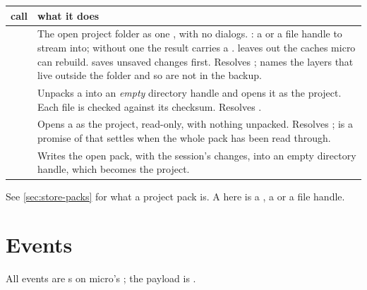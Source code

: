 \begin{tabularx}{\linewidth}{@{}>{\raggedright\arraybackslash}p{44mm}L@{}}
\toprule
call & what it does \\
\midrule
{} & The open project folder as one , with no dialogs.
  : a  or a file handle to stream into; without one the result
  carries a .  leaves out the caches micro can rebuild.
   saves unsaved changes first. Resolves
  ;  names the layers that live
  outside the folder and so are not in the backup. \\
 & Unpacks a  into an \emph{empty} directory
  handle and opens it as the project. Each file is checked against its checksum. Resolves
  . \\
 & Opens a  as the project, read-only, with nothing
  unpacked. Resolves ;  is a promise
  of  that settles when the whole pack has been read through. \\
 & Writes the open pack, with the session's changes, into an empty
  directory handle, which becomes the project. \\
\bottomrule
\end{tabularx}

See \cref{sec:store-packs} for what a project pack is. A  here is a , a  or a file
handle.

\section{Events}\label{sec:host-events}

All events are s on micro's ; the payload is .

